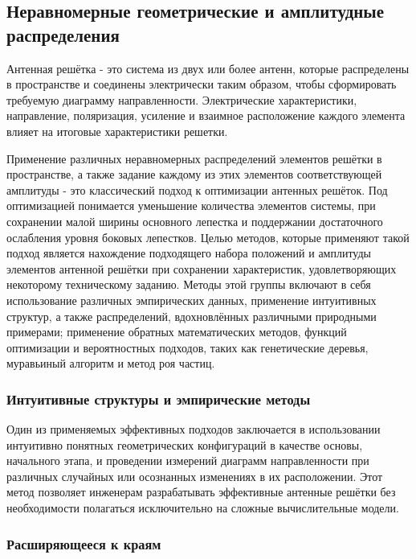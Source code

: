 \subsection{Неравномерные геометрические и амплитудные распределения}\label{sect:distributions}

Антенная решётка - это система из двух или более антенн, которые распределены в пространстве и соединены
электрически таким образом, чтобы сформировать требуемую диаграмму направленности. Электрические
характеристики, направление, поляризация, усиление и взаимное расположение каждого элемента
влияет на итоговые характеристики решетки.

Применение различных неравномерных распределений элементов решётки в пространстве, а также
задание каждому из этих элементов соответствующей амплитуды - это классический подход к оптимизации
антенных решёток. Под оптимизацией понимается уменьшение количества элементов системы, при сохранении
малой ширины основного лепестка и поддержании достаточного ослабления уровня боковых лепестков.
Целью методов, которые применяют такой подход является нахождение подходящего набора положений
и амплитуды элементов антенной решётки при сохранении характеристик, удовлетворяющих
некоторому техническому заданию. Методы этой группы включают в себя использование различных
эмпирических данных, применение интуитивных структур, а также распределений, вдохновлённых
различными природными примерами; применение обратных математических методов, функций оптимизации
и вероятностных подходов, таких как генетические деревья, муравьиный алгоритм и метод роя частиц.

\subsubsection{Интуитивные структуры и эмпирические методы}

Один из применяемых эффективных подходов заключается в использовании интуитивно понятных
геометрических конфигураций в качестве основы, начального  этапа, и проведении измерений
диаграмм направленности при различных случайных или осознанных изменениях в их расположении.
Этот метод позволяет инженерам разрабатывать эффективные антенные решётки без необходимости
полагаться исключительно на сложные вычислительные модели.

\subsubsection{Расширяющееся к краям}


